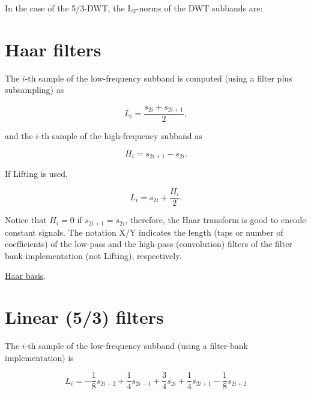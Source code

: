 In the case of the 5/3-DWT, the L\(_2\)-norms of the DWT subbands are:

\section{Haar filters~\cite{haar1910theorie}}
The \(i\)-th sample of the low-frequency subband is computed (using a
filter plus subsampling) as

\begin{equation}
  L_i=\frac{s_{2i}+s_{2i+1}}{2},
  \tag{HaarL}
  \label{eq:Haar_A-LPF}
\end{equation}

and the \(i\)-th sample of the high-frequency subband as

\begin{equation}
  H_i=s_{2i+1}-s_{2i}.
  \tag{HaarH}
  \label{eq:Haar_A-HPF}
\end{equation}

If Lifting is used,

\begin{equation}
  L_i=s_{2i}+\frac{H_i}{2}.
  \tag{HaarLLifted}
  \label{eq:Haar_A-LPF-lifting}
\end{equation}

Notice that \(H_i=0\) if \(s_{2i+1}=s_{2i}\), therefore, the Haar
transform is good to encode constant signals. The notation X/Y indicates
the length (taps or number of coefficients) of the low-pass and the
high-pass (convolution) filters of the filter bank implementation (not
Lifting), respectively.

\href{https://nbviewer.jupyter.org/github/vicente-gonzalez-ruiz/image_transformations_for_coding/blob/master/Haar_2d_basis.ipynb}{Haar basis}.

\section{Linear (5/3) filters~\cite{sweldens1997building}}
The $i$-th sample of the low-frequency subband (using a filter-bank implementation) is

\begin{equation}
  L_i=-\frac{1}{8}s_{2i-2}+\frac{1}{4}s_{2i-1}+\frac{3}{4}s_{2i}
  +\frac{1}{4}s_{2i+1}-\frac{1}{8}s_{2i+2}
  \tag{5/3L}
  \label{eq:Lineal_A-LPF}
\end{equation}

